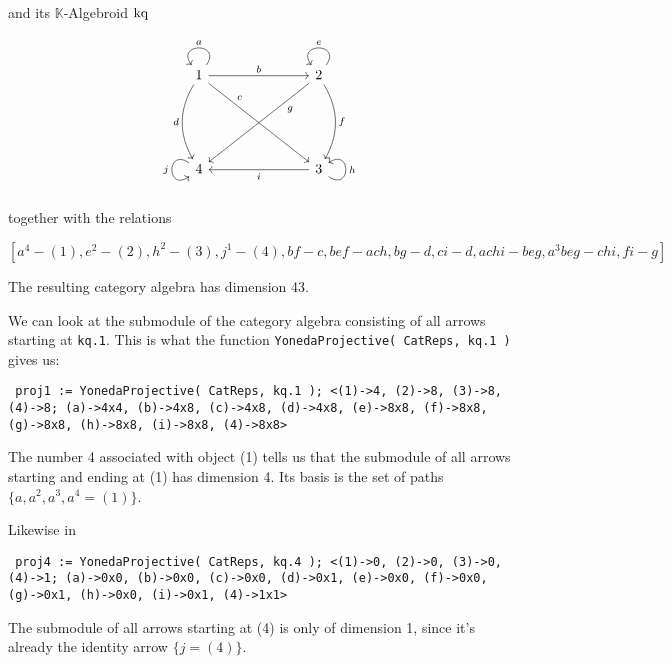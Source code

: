 and its $\mathbb{K}$-Algebroid $\textup{kq}$

\[
\begin{tikzcd}
1 \arrow["a"', loop, distance=2em, in=125, out=55] \arrow[rrr, "b"] \arrow[ddd, "d"', bend right] \arrow[rrrddd, "c", pos=0.25] &  &  & 2 \arrow["e"', loop, distance=2em, in=125, out=55] \arrow[ddd, "f", bend left] \arrow[lllddd, "g", pos=0.25] \\
                                                                                                                      &  &  &                                                                                                     \\
                                                                                                                      &  &  &                                                                                                     \\
4 \arrow["j"', loop, distance=2em, in=215, out=145]                                                                   &  &  & 3 \arrow["h"', loop, distance=2em, in=35, out=325] \arrow[lll, "i"]                                
\end{tikzcd}
\]

together with the relations

\[
[a^{4} - (1), e^{2} - (2), h^{2} - (3), j^{1} - (4), bf - c, bef-ach, bg-d, ci-d, achi-beg, a^{3}beg-chi, fi-g]
\]

The resulting category algebra has dimension 43.

We can look at the submodule of the category algebra consisting of all arrows starting at \texttt{kq.1}.
This is what the function \texttt{YonedaProjective( CatReps, kq.1 )} gives us:

\texttt{
proj1 := YonedaProjective( CatReps, kq.1 );
<(1)->4, (2)->8, (3)->8, (4)->8; (a)->4x4, (b)->4x8, (c)->4x8,
(d)->4x8, (e)->8x8, (f)->8x8, (g)->8x8, (h)->8x8, (i)->8x8, (4)->8x8>
}

The number 4 associated with object (1) tells us that the submodule of all arrows starting and ending at (1) has dimension 4.
Its basis is the set of paths $\{a, a^{2}, a^{3}, a^{4} = (1) \}$.

Likewise in

\texttt{
proj4 := YonedaProjective( CatReps, kq.4 );
<(1)->0, (2)->0, (3)->0, (4)->1; (a)->0x0, (b)->0x0, (c)->0x0,
(d)->0x1, (e)->0x0, (f)->0x0, (g)->0x1, (h)->0x0, (i)->0x1, (4)->1x1>
}

The submodule of all arrows starting at (4) is only of dimension 1, since it's already the identity arrow $\{j = (4)\}$.

